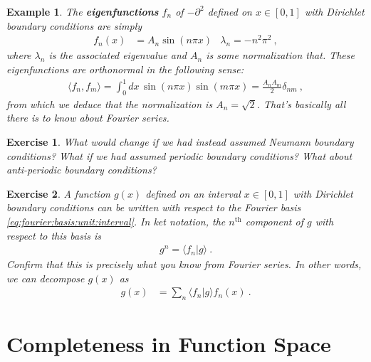 \documentclass[
  11pt,
	colorful,
	raggedright,
]{tufte-style-thesis-flip}
\newtheorem{exercise}{Exercise}[section]
\newtheorem{example}{Example}[section]
\begin{document}
\begin{example}\label{ex:eigenfunction:fourier}
The \textbf{eigenfunctions} $f_n$ of $-\partial^2$ defined on $x\in [0,1]$ with Dirichlet boundary conditions are simply 
\begin{align}
  f_n(x) &= A_n \sin(n\pi x) 
  &
  \lambda_n = - n^2\pi^2 \ ,
  \label{eq:fourier:basis:unit:interval}
\end{align}
where $\lambda_n$ is the associated eigenvalue and $A_n$ is some normalization that. These eigenfunctions are orthonormal in the following sense:
\begin{align}
  \langle f_n, f_m\rangle = \int_0^1 dx\, \sin(n\pi x)\sin(m\pi x) = \frac{A_nA_m}{2} \delta_{nm} \ ,
\end{align}
from which we deduce that the normalization is $A_n = \sqrt{2}$. That's basically all there is to know about Fourier series.
\end{example}
\begin{exercise}
What would change if we had instead assumed Neumann boundary conditions? What if we had assumed periodic boundary conditions? What about anti-periodic boundary conditions?
\end{exercise}
\begin{exercise}\label{exe:eigenfunction:fourier}
A function $g(x)$ defined on an interval $x\in [0,1]$ with Dirichlet boundary conditions can be written with respect to the Fourier basis \eqref{eq:fourier:basis:unit:interval}. In ket notation, the $n^\text{th}$ component of $g$ with respect to this basis is
\begin{align}
  g^n = \langle f_n| g\rangle \ .
\end{align}
Confirm that this is precisely what you know from Fourier series. In other words, we can decompose $g(x)$ as
\begin{align}
  g(x) &= \sum_n \langle f_n| g\rangle f_n(x)  \ .
\end{align}
\end{exercise}

\section{Completeness in Function Space}
\end{document}
